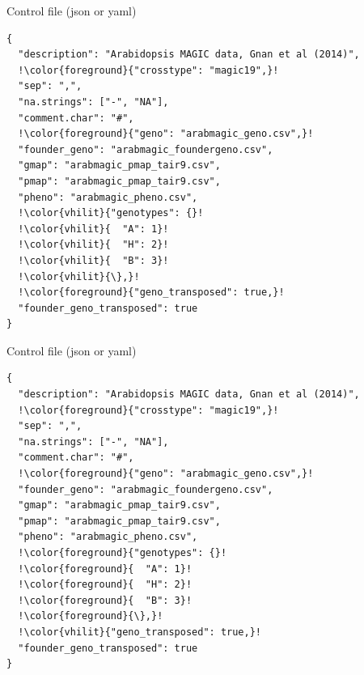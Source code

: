 \documentclass[12pt,t,aspectratio=169]{beamer}
\begin{document}
\begin{frame}[c,fragile]{Control file (json or yaml)}
\addtocounter{framenumber}{-1}
\begin{semiverbatim} \begin{lstlisting}[escapechar=!]
{
  "description": "Arabidopsis MAGIC data, Gnan et al (2014)",
  !\color{foreground}{"crosstype": "magic19",}!
  "sep": ",",
  "na.strings": ["-", "NA"],
  "comment.char": "#",
  !\color{foreground}{"geno": "arabmagic_geno.csv",}!
  "founder_geno": "arabmagic_foundergeno.csv",
  "gmap": "arabmagic_pmap_tair9.csv",
  "pmap": "arabmagic_pmap_tair9.csv",
  "pheno": "arabmagic_pheno.csv",
  !\color{vhilit}{"genotypes": {}!
  !\color{vhilit}{  "A": 1}!
  !\color{vhilit}{  "H": 2}!
  !\color{vhilit}{  "B": 3}!
  !\color{vhilit}{\},}!
  !\color{foreground}{"geno_transposed": true,}!
  "founder_geno_transposed": true
}
\end{lstlisting} \end{semiverbatim}
\end{frame}



\begin{frame}[c,fragile]{Control file (json or yaml)}
\addtocounter{framenumber}{-1}
\begin{semiverbatim} \begin{lstlisting}[escapechar=!]
{
  "description": "Arabidopsis MAGIC data, Gnan et al (2014)",
  !\color{foreground}{"crosstype": "magic19",}!
  "sep": ",",
  "na.strings": ["-", "NA"],
  "comment.char": "#",
  !\color{foreground}{"geno": "arabmagic_geno.csv",}!
  "founder_geno": "arabmagic_foundergeno.csv",
  "gmap": "arabmagic_pmap_tair9.csv",
  "pmap": "arabmagic_pmap_tair9.csv",
  "pheno": "arabmagic_pheno.csv",
  !\color{foreground}{"genotypes": {}!
  !\color{foreground}{  "A": 1}!
  !\color{foreground}{  "H": 2}!
  !\color{foreground}{  "B": 3}!
  !\color{foreground}{\},}!
  !\color{vhilit}{"geno_transposed": true,}!
  "founder_geno_transposed": true
}
\end{lstlisting} \end{semiverbatim}
\end{frame}
\end{document}

